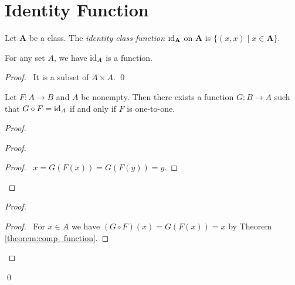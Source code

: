 \section{Identity Function}

\begin{definition}
    Let $\mathbf{A}$ be a class. The \emph{identity class function} $\mathrm{id}_{\mathbf{A}}$ on $\mathbf{A}$ is
    $\{ (x,x) \mid x \in \mathbf{A} \}$.
\end{definition}

\begin{theorem}
    For any set $A$, we have $\mathrm{id}_{A}$ is a function.
\end{theorem}

\begin{proof}
    \pf\ It is a subset of $A \times A$. \qed
\end{proof}

\begin{theorem}
    Let $F : A \rightarrow B$ and $A$ be nonempty. Then there exists a function
    $G : B \rightarrow A$ such that $G \circ F = \mathrm{id}_{A}$ if and only if $F$
    is one-to-one.
\end{theorem}

\begin{proof}
    \pf
    \begin{proof}
        \begin{proof}
            \pf\ $x = G(F(x)) = G(F(y)) = y$.
        \end{proof}
    \end{proof}
    \begin{proof}
        \begin{proof}
            \pf\ For $x \in A$ we have $(G \circ F)(x) = G(F(x)) = x$ by Theorem \ref{theorem:comp_function}.
        \end{proof}
    \end{proof}
    \qed
\end{proof}

